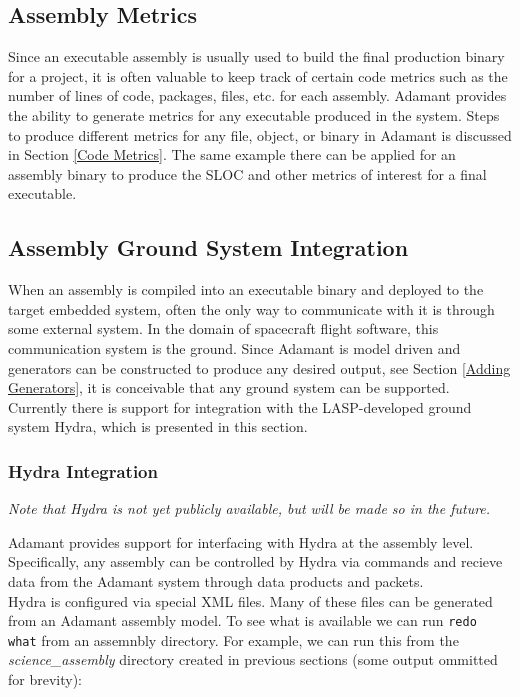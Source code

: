 \subsection{Assembly Metrics}

Since an executable assembly is usually used to build the final production binary for a project, it is often valuable to keep track of certain code metrics such as the number of lines of code, packages, files, etc. for each assembly. Adamant provides the ability to generate metrics for any executable produced in the system. Steps to produce different metrics for any file, object, or binary in Adamant is discussed in Section \ref{Code Metrics}. The same example there can be applied for an assembly binary to produce the SLOC and other metrics of interest for a final executable.

\subsection{Assembly Ground System Integration}

When an assembly is compiled into an executable binary and deployed to the target embedded system, often the only way to communicate with it is through some external system. In the domain of spacecraft flight software, this communication system is the ground. Since Adamant is model driven and generators can be constructed to produce any desired output, see Section \ref{Adding Generators}, it is conceivable that any ground system can be supported. Currently there is support for integration with the LASP-developed ground system Hydra, which is presented in this section.

\subsubsection{Hydra Integration}

\textit{Note that Hydra is not yet publicly available, but will be made so in the future.}

Adamant provides support for interfacing with Hydra at the assembly level. Specifically, any assembly can be controlled by Hydra via commands and recieve data from the Adamant system through data products and packets. \\

Hydra is configured via special XML files. Many of these files can be generated from an Adamant assembly model. To see what is available we can run \texttt{redo what} from an assemnbly directory. For example, we can run this from the \textit{science\_assembly} directory created in previous sections (some output ommitted for brevity):

